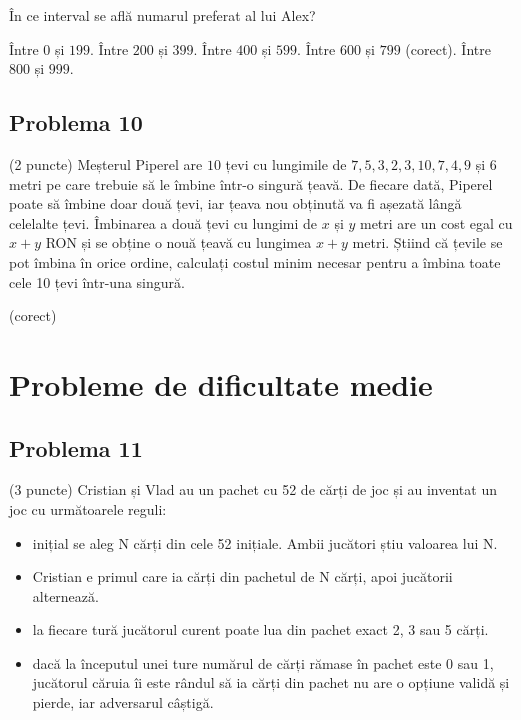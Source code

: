 \documentclass{exam}
\begin{document}
În ce interval se află numarul preferat al lui Alex?


\begin{oneparchoices}
    \choice Între $0$ și $199$.
    \choice Între $200$ și $399$.
    \choice Între $400$ și $599$.
    \choice Între $600$ și $799$ (corect).
    \choice Între $800$ și $999$.
\end{oneparchoices}



\subsection*{Problema 10}

(2 puncte) Meșterul Piperel are $10$ țevi cu lungimile de $7, 5, 3, 2, 3, 10, 7, 4, 9$ și $6$ metri pe care trebuie să le îmbine într-o singură țeavă. De fiecare dată, Piperel poate să îmbine doar două țevi, iar țeava nou obținută va fi așezată lângă celelalte țevi. Îmbinarea a două țevi cu lungimi de $x$ și $y$ metri are un cost egal cu $x + y$ RON și se obține o nouă țeavă cu lungimea $x + y$ metri. Știind că țevile se pot îmbina în orice ordine, calculați costul minim necesar pentru a îmbina toate cele 10 țevi într-una singură.

\begin{oneparchoices}
  (corect)
\end{oneparchoices}

\section{Probleme de dificultate medie}

\subsection*{Problema 11}

(3 puncte) Cristian și Vlad au un pachet cu 52 de cărți de joc și au inventat un joc cu următoarele reguli:
\begin{itemize}
    \item inițial se aleg N cărți din cele 52 inițiale. Ambii jucători știu valoarea lui N. 
    \item Cristian e primul care ia cărți din pachetul de N cărți, apoi jucătorii alternează.
    \item la fiecare tură jucătorul curent poate lua din pachet exact 2, 3 sau 5 cărți.
    \item dacă la începutul unei ture  numărul de cărți rămase în pachet este 0 sau 1, jucătorul căruia îi este rândul să ia cărți din pachet nu are o opțiune validă și pierde, iar adversarul câștigă.
\end{itemize}
\end{document}

